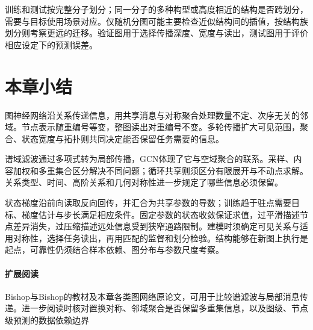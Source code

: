 训练和测试按完整分子划分；同一分子的多种构型或高度相近的结构是否跨划分，需要与目标使用场景对应。仅随机分图可能主要检查近似结构间的插值，按结构族划分则考察更远的迁移。验证图用于选择传播深度、宽度与读出，测试图用于评价相应设定下的预测误差。

\section{本章小结}
\label{sec:gnn-summary}

图神经网络沿关系传递信息，用共享消息与对称聚合处理数量不定、次序无关的邻域。节点表示随重编号等变，整图读出对重编号不变。多轮传播扩大可见范围，聚合、状态宽度与拓扑则共同决定能否保留任务需要的信息。

谱域滤波通过多项式转为局部传播，GCN体现了它与空域聚合的联系。采样、内容加权和多重集合区分解决不同问题；循环共享则须区分有限展开与不动点求解。关系类型、时间、高阶关系和几何对称性进一步规定了哪些信息必须保留。

状态梯度沿前向读取反向回传，并汇合为共享参数的导数；训练趋于驻点需要目标、梯度估计与步长满足相应条件。固定参数的状态收敛保证求值，过平滑描述节点差异消失，过压缩描述远处信息受到狭窄通路限制。建模时须确定可见关系与适用对称性，选择任务读出，再用匹配的监督和划分检验。结构能够在新图上执行是起点，可靠性仍须结合样本依赖、图分布与参数尺度考察。

\paragraph{扩展阅读}
Bishop与Bishop的教材及本章各类图网络原论文，可用于比较谱滤波与局部消息传递。进一步阅读时核对置换对称、邻域聚合是否保留多重集信息，以及图级、节点级预测的数据依赖边界
